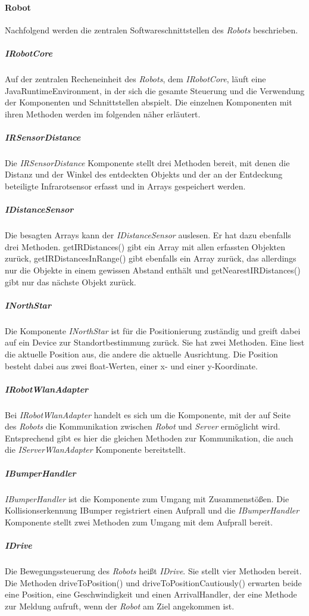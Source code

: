     \paragraph{Robot}\label{robot}
    		Nachfolgend werden die zentralen Softwareschnittstellen des \emph{Robots} beschrieben.
    	\subparagraph{IRobotCore}\label{irobotcore}
    		Auf der zentralen Recheneinheit des \emph{Robots}, dem \emph{IRobotCore}, läuft eine JavaRuntimeEnvironment, in der sich die gesamte Steuerung und die Verwendung der Komponenten und Schnittstellen abspielt.
    		Die einzelnen Komponenten mit ihren Methoden werden im folgenden näher erläutert.
    	\subparagraph{IRSensorDistance}\label{irsensordistance}
    		Die \emph{IRSensorDistance} Komponente stellt drei Methoden bereit, mit denen die Distanz und der Winkel des entdeckten Objekts und der an der Entdeckung beteiligte Infrarotsensor erfasst und in Arrays gespeichert werden.
    	\subparagraph{IDistanceSensor}\label{idistancesensor}
    		Die besagten Arrays kann der \emph{IDistanceSensor} auslesen.
    		Er hat dazu ebenfalls drei Methoden. getIRDistances() gibt ein Array mit allen erfassten Objekten zurück, getIRDistancesInRange() gibt ebenfalls ein Array zurück, das allerdings nur die Objekte in einem gewissen Abstand enthält und getNearestIRDistances() gibt nur das nächste Objekt zurück.
    	\subparagraph{INorthStar}\label{inorthstar}
    		Die Komponente \emph{INorthStar} ist für die Positionierung zuständig und greift dabei auf ein Device zur Standortbestimmung zurück.
    		Sie hat zwei Methoden.
    		Eine liest die aktuelle Position aus, die andere die aktuelle Ausrichtung.
    		Die Position besteht dabei aus zwei float-Werten, einer x- und einer y-Koordinate.
    	\subparagraph{IRobotWlanAdapter}\label{irobotwlanadapter}
    		Bei \emph{IRobotWlanAdapter} handelt es sich um die Komponente, mit der auf Seite des \emph{Robots} die Kommunikation zwischen \emph{Robot} und \emph{Server} ermöglicht wird.
    		Entsprechend gibt es hier die gleichen Methoden zur Kommunikation, die auch die \emph{IServerWlanAdapter} Komponente bereitstellt.
    	\subparagraph{IBumperHandler}\label{ibumperhandler}
    		\emph{IBumperHandler} ist die Komponente zum Umgang mit Zusammenstößen.
    		Die Kollisionserkennung IBumper registriert einen Aufprall und die \emph{IBumperHandler} Komponente stellt zwei Methoden zum Umgang mit dem Aufprall bereit.
    	\subparagraph{IDrive}\label{idrive}
    		Die Bewegungssteuerung des \emph{Robots} heißt \emph{IDrive}.
    		Sie stellt vier Methoden bereit.
    		Die Methoden driveToPosition() und driveToPositionCautiously() erwarten beide eine Position, eine Geschwindigkeit und einen ArrivalHandler, der eine Methode zur Meldung aufruft, wenn der \emph{Robot} am Ziel angekommen ist.
